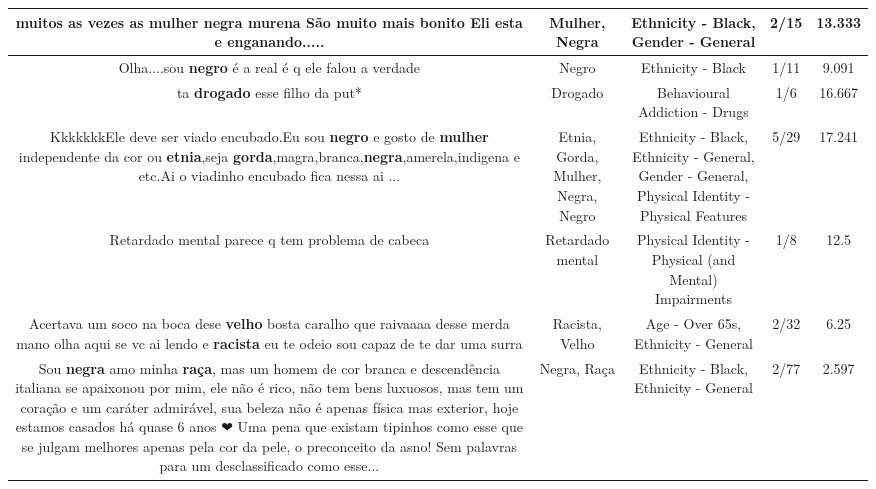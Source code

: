 \documentclass[11pt]{article}
\newlength\mylength
\begin{document}
\begin{center}
\begin{longtable}{|C{.65\mylength}|C{.30\mylength}|C{.12\mylength}|C{.12\mylength}|C{.12\mylength}|}
  \small muitos as vezes as \textbf{mulher} \textbf{negra} murena São  muito mais bonito Eli esta e enganando.....\normalsize   & Mulher, Negra & Ethnicity - Black, Gender - General & 2/15 & 13.333 \\  \hline
  \small Olha....sou \textbf{negro} é a real é q ele falou a verdade\normalsize   & Negro & Ethnicity - Black & 1/11 & 9.091 \\  \hline
  \small ta \textbf{drogado} esse filho da put*\normalsize   & Drogado & Behavioural Addiction - Drugs & 1/6 & 16.667 \\  \hline
  \small KkkkkkkEle deve ser viado encubado.Eu sou \textbf{negro} e gosto de \textbf{mulher} independente da cor ou \textbf{etnia},seja \textbf{gorda},magra,branca,\textbf{negra},amerela,indigena e etc.Ai o viadinho encubado fica nessa  ai ...\normalsize   & Etnia, Gorda, Mulher, Negra, Negro & Ethnicity - Black, Ethnicity - General, Gender - General, Physical Identity - Physical Features & 5/29 & 17.241 \\  \hline
  \small Retardado mental parece q tem problema de cabeca\normalsize   & Retardado mental & Physical Identity - Physical (and Mental) Impairments & 1/8 & 12.5 \\  \hline
  \small Acertava um soco na boca dese \textbf{velho} bosta caralho que raivaaaa desse merda mano olha aqui se vc ai lendo e \textbf{racista} eu te odeio sou capaz de te dar uma surra\normalsize   & Racista, Velho & Age - Over 65s, Ethnicity - General & 2/32 & 6.25 \\  \hline
  \small Sou \textbf{negra} amo minha \textbf{raça}, mas um homem de cor branca e descendência italiana se apaixonou por mim, ele não é rico, não tem bens luxuosos, mas tem um coração e um caráter admirável, sua beleza não é apenas física mas exterior, hoje estamos casados há quase 6 anos ❤ Uma pena que existam tipinhos como esse que se julgam melhores apenas pela cor da pele, o preconceito da asno! Sem palavras para um desclassificado como esse...\normalsize   & Negra, Raça & Ethnicity - Black, Ethnicity - General & 2/77 & 2.597 \\  \hline

\end{longtable}
\end{center}
\end{document}
